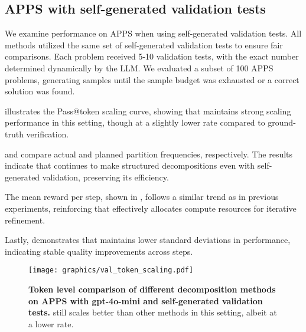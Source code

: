 \subsection{APPS with self-generated validation tests}
\label{sec:val_tests}
We examine \decomp performance on APPS when using self-generated validation tests. All methods utilized the same set of self-generated validation tests to ensure fair comparisons. Each problem received 5-10 validation tests, with the exact number determined dynamically by the LLM. We evaluated a subset of 100 APPS problems, generating samples until the sample budget was exhausted or a correct solution was found.

 illustrates the Pass@token scaling curve, showing that \decomp maintains strong scaling performance in this setting, though at a slightly lower rate compared to ground-truth verification.

 and  compare actual and planned partition frequencies, respectively. The results indicate that \decomp continues to make structured decompositions even with self-generated validation, preserving its efficiency.

The mean reward per step, shown in , follows a similar trend as in previous experiments, reinforcing that \decomp effectively allocates compute resources for iterative refinement.

Lastly,  demonstrates that \decomp maintains lower standard deviations in performance, indicating stable quality improvements across steps.


\begin{figure}[ht]
    \centering
    \texttt{[image: graphics/val\_token\_scaling.pdf]}
    \caption{\textbf{Token level comparison of different decomposition methods on APPS with gpt-4o-mini and self-generated validation tests.} \decomp still scales better than other methods in this setting, albeit at a lower rate.}
    \label{fig:val_token}
\end{figure}

